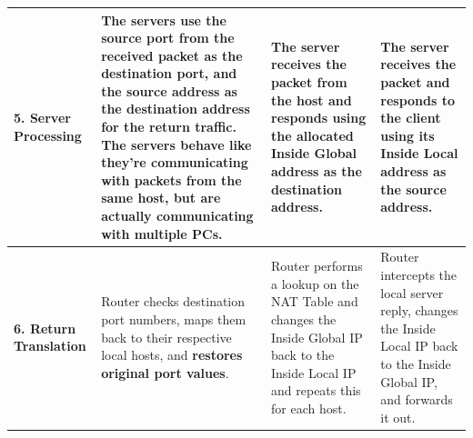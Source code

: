 \documentclass{article}
\begin{document}
\begin{table}[h!]
\begin{tabularx}{\textwidth}{l|Y|Y|Y}
\textbf{5. Server Processing} & 
The servers use the source port from the received packet as the destination port, and the source address as the destination address for the return traffic. The servers behave like they're communicating with packets from the same host, but are actually communicating with multiple PCs. & 
The server receives the packet from the host and responds using the allocated Inside Global address as the destination address. & 
The server receives the packet and responds to the client using its Inside Local address as the source address. \\
\hline

\textbf{6. Return Translation} & 
Router checks destination port numbers, maps them back to their respective local hosts, and \textbf{restores original port values}. & 
Router performs a lookup on the NAT Table and changes the Inside Global IP back to the Inside Local IP and repeats this for each host. & 
Router intercepts the local server reply, changes the Inside Local IP back to the Inside Global IP, and forwards it out. \\
\bottomrule
\end{tabularx}
\end{table}
\end{document}
